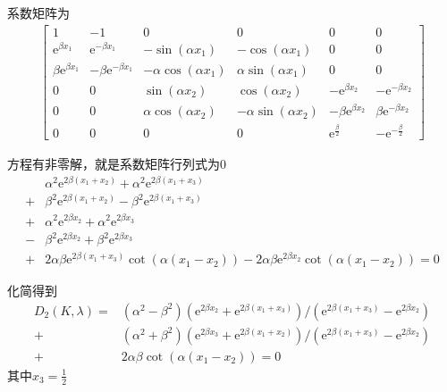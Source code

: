 \documentclass[12pt,a4paper]{article}
\begin{document}
系数矩阵为
\begin{align*}
\left[\begin{array}{cccccc} 1 & -1 & 0 & 0 & 0 & 0\\ \mathrm{e}^{\beta x_1} & \mathrm{e}^{- \beta x_1} & - \sin\!\left(\alpha x_1\right) & - \cos\!\left(\alpha x_1\right) & 0 & 0\\ \beta \mathrm{e}^{\beta x_1} & - \beta \mathrm{e}^{- \beta x_1} & - \alpha \cos\!\left(\alpha x_1\right) & \alpha \sin\!\left(\alpha x_1\right) & 0 & 0\\ 0 & 0 & \sin\!\left(\alpha x_2\right) & \cos\!\left(\alpha x_2\right) & - \mathrm{e}^{\beta x_2} & - \mathrm{e}^{- \beta x_2}\\ 0 & 0 & \alpha \cos\!\left(\alpha x_2\right) & - \alpha \sin\!\left(\alpha x_2\right) & - \beta \mathrm{e}^{\beta x_2} & \beta \mathrm{e}^{- \beta x_2}\\ 0 & 0 & 0 & 0 & \mathrm{e}^{\frac{\beta}{2}} & - \mathrm{e}^{-\frac{\beta}{2}} \end{array}\right]
\end{align*}

方程有非零解，就是系数矩阵行列式为0
\begin{align*}
& \alpha^2 \mathrm{e}^{2 \beta (x_{1} + x_{2})}  + \alpha^2 \mathrm{e}^{2 \beta (x_{1} + x_{3})} \\
+ & \beta^2 \mathrm{e}^{2 \beta (x_{1} + x_{2})} - \beta^2 \mathrm{e}^{2 \beta (x_{1} + x_{3})} \\
+ & \alpha^2 \mathrm{e}^{2 \beta x_{2}}  + \alpha^2 \mathrm{e}^{2 \beta x_{3}} \\
- & \beta^2 \mathrm{e}^{2 \beta x_{2}} + \beta^2 \mathrm{e}^{2 \beta x_{3}} \\
+ & 2 \alpha \beta \mathrm{e}^{2 \beta (x_{1} + x_{3})} \cot(\alpha (x_{1} - x_{2})) - 2 \alpha \beta \mathrm{e}^{2 \beta x_{2}} \cot(\alpha (x_{1} - x_{2})) = 0
\end{align*}

化简得到
\begin{align*}
D_2(K, \lambda) = & (\alpha^2 - \beta^2)(\mathrm{e}^{2 \beta x_2} + \mathrm{e}^{2 \beta (x_1+x_3)}) / (\mathrm{e}^{2 \beta (x_1+x_3)} - \mathrm{e}^{2 \beta x_2}) \\
+ & (\alpha^2 + \beta^2)(\mathrm{e}^{2 \beta x_3} + \mathrm{e}^{2 \beta (x_1+x_2)}) / (\mathrm{e}^{2 \beta (x_1+x_3)} - \mathrm{e}^{2 \beta x_2}) \\
+ & 2 \alpha \beta \cot(\alpha (x_1 - x_2))= 0
\end{align*}
其中$x_3 = \frac12$
\end{document}
